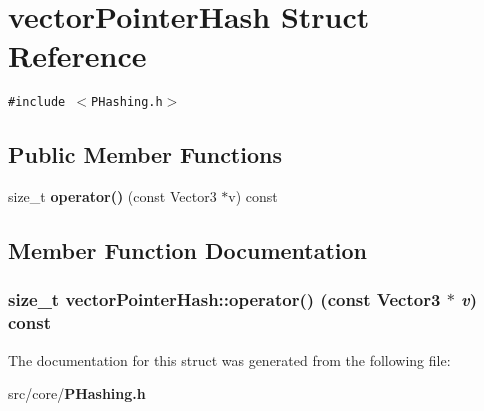 \section{vector\-Pointer\-Hash Struct Reference}
\label{structvectorPointerHash}
{\tt \#include $<$PHashing.h$>$}

\subsection*{Public Member Functions}
\begin{CompactItemize}
\item 
size\_\-t {\bf operator()} (const Vector3 $\ast$v) const 
\end{CompactItemize}


\subsection{Member Function Documentation}
\subsubsection{\setlength{\rightskip}{0pt plus 5cm}size\_\-t vector\-Pointer\-Hash::operator() (const Vector3 $\ast$ {\em v}) const\hspace{0.3cm}{\tt  [inline]}}\label{structvectorPointerHash_9768707a341468ac01256f958373d1dc}




The documentation for this struct was generated from the following file:\begin{CompactItemize}
\item 
src/core/{\bf PHashing.h}\end{CompactItemize}
